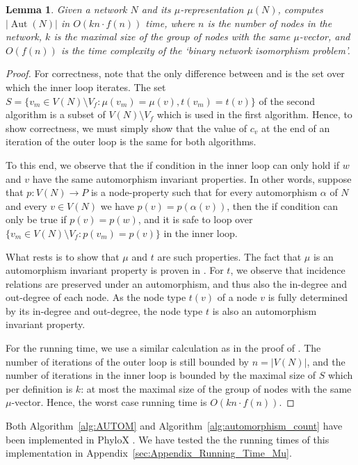 \documentclass{article}
\newtheorem{lemma}{Lemma}
\theoremstyle{definition}
\DeclareMathOperator{\Aut}{Aut}
\begin{document}
\begin{lemma}
Given a network $N$ and its $\mu$-representation $\mu(N)$,  computes $|\Aut(N)|$ in $O(kn\cdot f(n))$ time, where $n$ is the number of nodes in the network, $k$ is the maximal size of the group of nodes with the same $\mu$-vector, and $O(f(n))$ is the time complexity of the `binary network isomorphism problem'. 
\end{lemma}
\begin{proof}
    For correctness, note that the only difference between  and  is the set over which the inner loop iterates. The set $S=\{v_m \in V(N)\setminus V_f: \mu(v_m) = \mu(v), t(v_m) = t(v)\}$ of the second algorithm is a subset of $V(N)\setminus V_f$ which is used in the first algorithm. Hence, to show correctness, we must simply show that the value of $c_v$ at the end of an iteration of the outer loop is the same for both algorithms.
    
    To this end, we observe that the if condition in the inner loop can only hold if $w$ and $v$ have the same automorphism invariant properties. In other words, suppose that $p:V(N) \to P$ is a node-property such that for every automorphism $\alpha$ of $N$ and every $v\in V(N)$ we have $p(v)=p(\alpha(v))$, then the if condition can only be true if $p(v)=p(w)$, and it is safe to loop over $\{v_m \in V(N)\setminus V_f: p(v_m) = p(v)\}$ in the inner loop.

    What rests is to show that $\mu$ and $t$ are such properties. The fact that $\mu$ is an automorphism invariant property is proven in . For $t$, we observe that incidence relations are preserved under an automorphism, and thus also the in-degree and out-degree of each node. As the node type $t(v)$ of a node $v$ is fully determined by its in-degree and out-degree, the node type $t$ is also an automorphism invariant property.
    
    For the running time, we use a similar calculation as in the proof of . The number of iterations of the outer loop is still bounded by $n=|V(N)|$, and the number of iterations in the inner loop is bounded by the maximal size of $S$ which per definition is $k$: at most the maximal size of the group of nodes with the same $\mu$-vector. Hence, the worst case running time is $O(kn\cdot f(n))$.
\end{proof}

Both Algorithm~\ref{alg:AUTOM} and Algorithm~\ref{alg:automorphism_count} have been implemented in PhyloX \cite{janssen2024phylox}. We have tested the the running times of this implementation in Appendix~\ref{sec:Appendix_Running_Time_Mu}.
\end{document}
